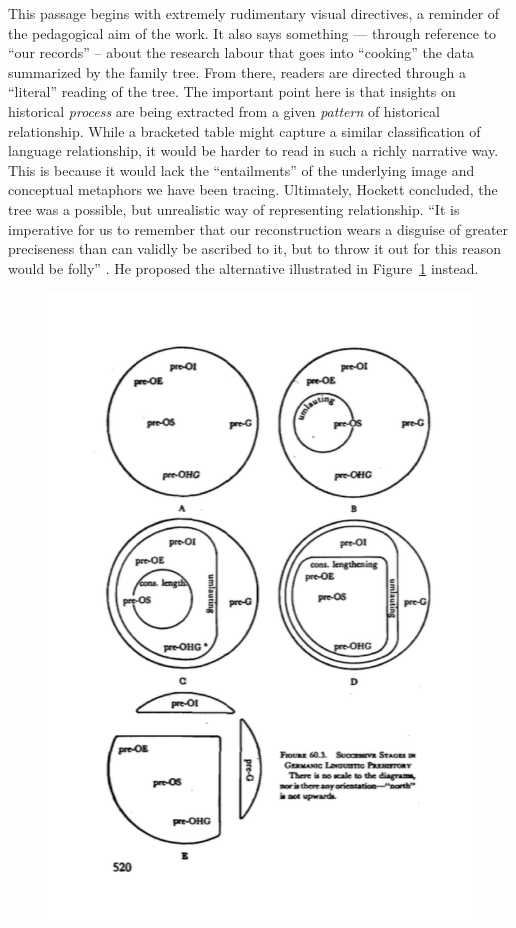 \documentclass[output=paper]{langscibook}
\begin{document}
This passage begins with extremely rudimentary visual directives, a reminder of the pedagogical aim of the work. It also says something — through reference to ``our records'' – about the research labour that goes into ``cooking'' the data summarized by the family tree. From there, readers are directed through a ``literal'' reading of the tree. The important point here is that insights on historical \emph{process} are being extracted from a given \emph{pattern} of historical relationship. While a bracketed table might capture a similar classification of language relationship, it would be harder to read in such a richly narrative way. This is because it would lack the ``entailments'' of the underlying image and conceptual metaphors we have been tracing. Ultimately, Hockett concluded, the tree was a possible, but unrealistic way of representing relationship. ``It is imperative for us to remember that our reconstruction wears a disguise of greater preciseness than can validly be ascribed to it, but to throw it out for this reason would be folly'' \citep[523]{Hockett19591958}. He proposed the alternative illustrated in Figure~\ref{fig:kaplan:hockett1959520} instead.

\begin{figure}
    \centering
    \includegraphics[scale=0.8]{figures/hockett1958-520.png}
    \caption{\citet[520]{Hockett19591958}}
    \label{fig:kaplan:hockett1959520}
\end{figure}
\end{document}
